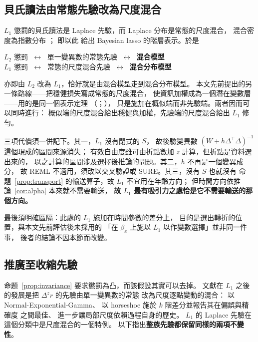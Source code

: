\documentclass[UTF8, fontset=macnew, a4paper, 12pt]{ctexart}
\begin{document}
\subsection{貝氏讀法由常態先驗改為尺度混合}\label{subsec:l1-bayes}

$L_1$ 懲罰的貝氏讀法是 Laplace 先驗，而 Laplace 分布是常態的尺度混合，
混合密度為指數分布 \citep{andrews1974}；\citet{parkcasella2008} 即以此
給出 Bayesian lasso 的階層表示。於是

\begin{center}
\begin{minipage}{0.88\textwidth}\small
$L_2$ 懲罰 $\;\longleftrightarrow\;$ 單一變異數的常態先驗 $\;\longleftrightarrow\;$ \textbf{混合模型}\\[3pt]
$L_1$ 懲罰 $\;\longleftrightarrow\;$ 常態的尺度混合先驗 $\;\longleftrightarrow\;$ \textbf{混合分布模型}
\end{minipage}
\end{center}

亦即由 $L_2$ 改為 $L_1$，恰好就是由混合模型走到混合分布模型。
本文先前提出的另一條路線——把穩健損失寫成常態的尺度混合，
使資訊加權成為一個潛在變數層——用的是同一個表示定理
（\citealp{andrews1974}；\citealp{hunter2000}），
只是施加在概似端而非先驗端。兩者因而可以同時進行：
概似端的尺度混合給出穩健與加權，先驗端的尺度混合給出 $L_1$ 修勻。

三項代價須一併記下。其一，$L_1$ 沒有閉式的 $S$，
故後驗變異數 $(W+h\Delta^{\top}\Delta)^{-1}$ 這個現成的區間來源消失；
有效自由度雖可由折點數加 $z$ 計算，但折點是資料選出來的，
以之計算的區間涉及選擇後推論的問題。其二，$h$ 不再是一個變異成分，
故 REML 不適用，須改以交叉驗證或 SURE。其三，沒有 $S$ 也就沒有
命題~\ref{prop:transport} 的輸送算子，故 $L_1$ 不宜用在年齡方向；
但時間方向依推論~\ref{cor:alpha} 本來就不需要輸送，
\textbf{故 $L_1$ 最有吸引力之處恰是它不需要輸送的那個方向。}

最後須明確區隔：此處的 $L_1$ 施加在時間參數的差分上，
目的是選出轉折的位置，與本文先前評估後未採用的
「在 $\beta_x$ 上施以 $L_1$ 以作變數選擇」並非同一件事，
後者的結論不因本節而改變。


\subsection{推廣至收縮先驗}\label{subsec:shrink}

命題~\ref{prop:invariance} 要求懲罰為凸，而該假設其實可以去掉。
文獻在 $L_1$ 之後的發展是把 $\Delta^{z}r$ 的先驗由單一變異數的常態
改為尺度逐點變動的混合：\citet{jullion2007} 以 Normal-Exponential-Gamma、
\citet{faulkner2018} 以 horseshoe 施於 $k$ 階差分並報告其在偏誤與精確度
之間最佳、\citet{kowal2019} 進一步讓局部尺度依賴過程自身的歷史。
$L_1$ 的 Laplace 先驗在這個分類中是尺度混合的一個特例。
以下指出\textbf{整族先驗都保留同樣的兩項不變性}。
\end{document}
